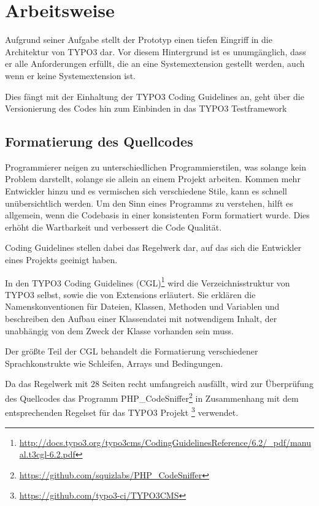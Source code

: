 \section{Arbeitsweise}
\label{sec:workstyle}
Aufgrund seiner Aufgabe stellt der Prototyp einen tiefen Eingriff in die Architektur von TYPO3 dar. Vor diesem Hintergrund ist es unumgänglich, dass er alle Anforderungen erfüllt, die an eine Systemextension gestellt werden, auch wenn er keine Systemextension ist.

Dies fängt mit der Einhaltung der TYPO3 Coding Guidelines an, geht über die Versionierung des Codes hin zum Einbinden in das TYPO3 Testframework

\subsection{Formatierung des Quellcodes}
Programmierer neigen zu unterschiedlichen Programmierstilen, was solange kein Problem darstellt, solange sie allein an einem Projekt arbeiten. Kommen mehr Entwickler hinzu und es vermischen sich verschiedene Stile, kann es schnell unübersichtlich werden. Um den Sinn eines Programms zu verstehen, hilft es allgemein, wenn die Codebasis in einer konsistenten Form formatiert wurde. Dies erhöht die Wartbarkeit und verbessert die Code Qualität.

Coding Guidelines stellen dabei das Regelwerk dar, auf das sich die Entwickler eines Projekts geeinigt haben.

In den TYPO3 Coding Guidelines (CGL)\footnote{\url{http://docs.typo3.org/typo3cms/CodingGuidelinesReference/6.2/_pdf/manual.t3cgl-6.2.pdf}} wird die Verzeichnisstruktur von TYPO3 selbst, sowie die von Extensions erläutert. Sie erklären die Namenskonventionen für Dateien, Klassen, Methoden und Variablen und beschreiben den Aufbau einer Klassendatei mit notwendigem Inhalt, der unabhängig von dem Zweck der Klasse vorhanden sein muss.

Der größte Teil der CGL behandelt die Formatierung verschiedener Sprachkonstrukte wie Schleifen, Arrays und Bedingungen.

Da das Regelwerk mit 28 Seiten recht umfangreich ausfällt, wird zur Überprüfung des Quellcodes das Programm PHP\_CodeSniffer\footnote{\url{https://github.com/squizlabs/PHP_CodeSniffer}} in Zusammenhang mit dem entsprechenden Regelset für das TYPO3 Projekt \footnote{\url{https://github.com/typo3-ci/TYPO3CMS}} verwendet.

